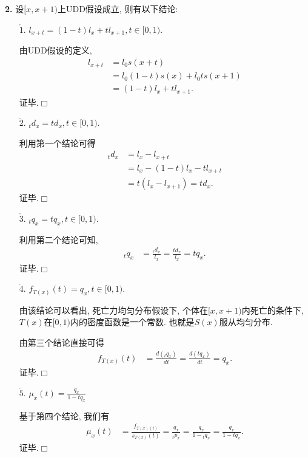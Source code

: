 \documentclass[a4paper,openany, 10pt]{ctexbook}
\def\qed{\hfill$\Box$\medskip}
\begin{document}
{\rm\bf2.} 设$[x,x+1)$上UDD假设成立, 则有以下结论:
\begin{enumerate}
    \item[$\mathring 1.$] $l_{x+t}=(1-t)l_{x}+tl_{x+1},t\in [0,1).$

        \proof 由UDD假设的定义, \begin{align*}
            l_{x+t} & =l_{0}s(x+t)                 \\
                    & =l_{0}(1-t)s(x)+l_{0}ts(x+1) \\
                    & =(1-t)l_{x}+tl_{x+1}.
        \end{align*}
        证毕.\qed
    \item[$\mathring 2.$] $_{t}d_{x}=td_{x},t\in [0,1).$

 \proof
利用第一个结论可得
       \begin{align*}
            _{t}d_{x} & =l_{x}-l_{x+t}             \\
                      & =l_x-(1-t)l_{x}-tl_{x+t}   \\
                      & =t(l_{x}-l_{x+1}) =td_{x}.
        \end{align*}
        证毕.\qed
    \item[$\mathring 3.$] $_{t}q_{x}=tq_{x},t\in [0,1).$

        \proof 利用第二个结论可知, \begin{align*}
            _{t}q_{x} & =\frac{_{t}d_{x}}{l_{x}} =\frac{td_{x}}{l_{x}}  = tq_{x}.
        \end{align*}
        证毕.\qed
    \item[$\mathring 4.$] $f_{T(x)}(t)=q_{x},t\in [0,1).$

        由该结论可以看出, 死亡力均匀分布假设下, 个体在$[x,x+1)$内死亡的条件下, $T(x)$在$[0,1)$内的密度函数是一个常数. 也就是$S(x)$服从均匀分布.

        \proof 由第三个结论直接可得\begin{align*}
            f_{T(x)}(t) & =\frac{d(_{t}q_{x})}{dt} =\frac{d(tq_{x})}{dt} =q_x.
        \end{align*}
        证毕.\qed
    \item [$\mathring 5.$] $\mu_{x}(t)=\frac{q_{x}}{1-tq_x}$

          \proof 基于第四个结论, 我们有\begin{align*}
              \mu_{x}(t) & =\frac{f_{T(x)(t)}}{s_{T(x)}(t)} =\frac{q_{x}}{_{t}p_{x}} =\frac{q_{x}}{1-{}_{t}q_{x}} =\frac{q_{x}}{1-tq_{x}}.
          \end{align*}
          证毕.\qed
\end{enumerate}
\end{document}
